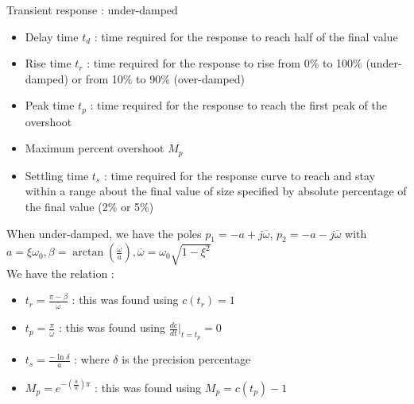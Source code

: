 \documentclass[../main.tex]{subfiles}
\begin{document}
Transient response : under-damped \begin{itemize}
    \item Delay time $t_d$ : time required for the response to reach half of the final value\\
    \item Rise time $t_r$ : time required for the response to rise from 0\% to 100\% (under-damped) or from 10\% to 90\% (over-damped)\\
    \item Peak time $t_p$ : time required for the response to reach the first peak of the overshoot\\
    \item Maximum percent overshoot $M_p$\\
    \item Settling time $t_s$ : time required for the response curve to reach and stay within a range about the final value of size specified by absolute percentage of the final value (2\% or 5\%)\\
\end{itemize}

When under-damped, we have the poles $p_1 = -a+j\overline{\omega}$, $p_2 = -a-j\overline{\omega}$ with \\
$a = \xi \omega_0, \beta = \arctan(\frac{\overline{\omega}}{a}), \overline{\omega} = \omega_0 \sqrt{1-\xi^2}$\\

We have the relation : \begin{itemize}
    \item $t_r = \frac{\pi-\beta}{\overline{\omega}}$ : this was found using $c(t_r) = 1$\\
    \item $t_p = \frac{\pi}{\overline{\omega}}$ : this was found using $\frac{dc}{dt}\rvert_{t=t_p} = 0$\\
    \item $t_s = \frac{-\ln{\delta}}{a}$ : where $\delta$ is the precision percentage\\
    \item $M_p = e^{-(\frac{a}{\overline{w}}) \pi}$ : this was found using $M_p = c(t_p)-1$\\
\end{itemize}
\end{document}
